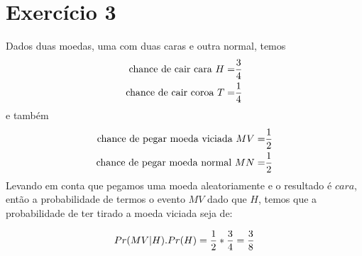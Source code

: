 \documentclass{article}
\begin{document}
\section{Exercício 3}
Dados duas moedas, uma com duas caras e outra normal, temos
\begin{equation}
	\notag
	\begin{split}
		\text{chance de cair cara }H =& \dfrac{3}{4}\\
		\text{chance de cair coroa }T =& \dfrac{1}{4}\\
	\end{split}
\end{equation}
e também
\begin{equation}
	\notag
	\begin{split}
		\text{chance de pegar moeda viciada }MV =& \dfrac{1}{2}\\
		\text{chance de pegar moeda normal }MN =& \dfrac{1}{2}\\
	\end{split}
\end{equation}
Levando em conta que pegamos uma moeda aleatoriamente e o resultado é $cara$,
então a probabilidade de termos o evento $MV$ dado que $H$, temos que a probabilidade
de ter tirado a moeda viciada seja de:

\begin{equation}
	\notag
	\begin{split}
		Pr(MV | H).Pr(H) = \dfrac{1}{2}*\dfrac{3}{4} = \dfrac{3}{8}
	\end{split}
\end{equation}
\end{document}
